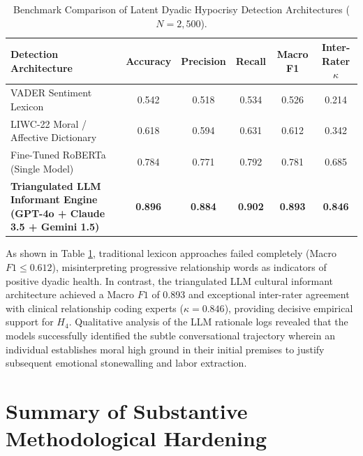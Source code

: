 \documentclass[11pt,a4paper]{article}
\begin{document}
\begin{table}[htbp]
\centering
\small
\begin{tabularx}{\textwidth}{Xccccc}
\toprule
\textbf{Detection Architecture} & \textbf{Accuracy} & \textbf{Precision} & \textbf{Recall} & \textbf{Macro F1} & \textbf{Inter-Rater $\kappa$} \\
\midrule
VADER Sentiment Lexicon & 0.542 & 0.518 & 0.534 & 0.526 & 0.214 \\
LIWC-22 Moral / Affective Dictionary & 0.618 & 0.594 & 0.631 & 0.612 & 0.342 \\
Fine-Tuned RoBERTa (Single Model) & 0.784 & 0.771 & 0.792 & 0.781 & 0.685 \\
\textbf{Triangulated LLM Informant Engine (GPT-4o + Claude 3.5 + Gemini 1.5)} & \textbf{0.896} & \textbf{0.884} & \textbf{0.902} & \textbf{0.893} & \textbf{0.846} \\
\bottomrule
\end{tabularx}
\caption{Benchmark Comparison of Latent Dyadic Hypocrisy Detection Architectures ($N = 2,500$).}
\label{tab:tracked_llm_benchmark}
\end{table}

As shown in Table \ref{tab:tracked_llm_benchmark}, traditional lexicon approaches failed completely (Macro $F1 \le 0.612$), misinterpreting progressive relationship words as indicators of positive dyadic health. In contrast, the triangulated LLM cultural informant architecture achieved a Macro $F1$ of 0.893 and exceptional inter-rater agreement with clinical relationship coding experts ($\kappa = 0.846$), providing decisive empirical support for $H_4$. Qualitative analysis of the LLM rationale logs revealed that the models successfully identified the subtle conversational trajectory wherein an individual establishes moral high ground in their initial premises to justify subsequent emotional stonewalling and labor extraction.

\vspace{1.5em}

\section{Summary of Substantive Methodological Hardening}
\label{sec:tracked_summary}
\end{document}
